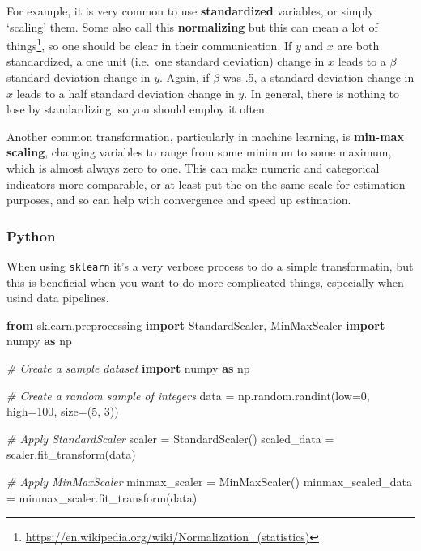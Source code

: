 \documentclass[
  letterpaper,
]{krantz}
\newenvironment{Shaded}{}{}
\newcommand{\CommentTok}[1]{\textcolor[rgb]{0.38,0.63,0.69}{\textit{#1}}}
\newcommand{\DecValTok}[1]{\textcolor[rgb]{0.25,0.63,0.44}{#1}}
\newcommand{\ImportTok}[1]{\textcolor[rgb]{0.00,0.50,0.00}{\textbf{#1}}}
\newcommand{\NormalTok}[1]{#1}
\newcommand{\OperatorTok}[1]{\textcolor[rgb]{0.40,0.40,0.40}{#1}}
\DeclareRobustCommand{\href}[2]{#2\footnote{\url{#1}}}
\begin{document}
For example, it is very common to use \textbf{standardized} variables,
or simply `scaling' them. Some also call this \textbf{normalizing} but
\href{https://en.wikipedia.org/wiki/Normalization_(statistics)}{this can
mean a lot of things}, so one should be clear in their communication. If
\(y\) and \(x\) are both standardized, a one unit (i.e.~one standard
deviation) change in \(x\) leads to a \(\beta\) standard deviation
change in \(y\). Again, if \(\beta\) was .5, a standard deviation change
in \(x\) leads to a half standard deviation change in \(y\). In general,
there is nothing to lose by standardizing, so you should employ it
often.

Another common transformation, particularly in machine learning, is
\textbf{min-max scaling}, changing variables to range from some minimum
to some maximum, which is almost always zero to one. This can make
numeric and categorical indicators more comparable, or at least put the
on the same scale for estimation purposes, and so can help with
convergence and speed up estimation.

\subsubsection{Python}

When using \texttt{sklearn} it's a very verbose process to do a simple
transformatin, but this is beneficial when you want to do more
complicated things, especially when usind data pipelines.

\begin{Shaded}
\begin{Highlighting}[]
\ImportTok{from}\NormalTok{ sklearn.preprocessing }\ImportTok{import}\NormalTok{ StandardScaler, MinMaxScaler}
\ImportTok{import}\NormalTok{ numpy }\ImportTok{as}\NormalTok{ np}

\CommentTok{\# Create a sample dataset}
\ImportTok{import}\NormalTok{ numpy }\ImportTok{as}\NormalTok{ np}

\CommentTok{\# Create a random sample of integers}
\NormalTok{data }\OperatorTok{=}\NormalTok{ np.random.randint(low}\OperatorTok{=}\DecValTok{0}\NormalTok{, high}\OperatorTok{=}\DecValTok{100}\NormalTok{, size}\OperatorTok{=}\NormalTok{(}\DecValTok{5}\NormalTok{, }\DecValTok{3}\NormalTok{))}

\CommentTok{\# Apply StandardScaler}
\NormalTok{scaler }\OperatorTok{=}\NormalTok{ StandardScaler()}
\NormalTok{scaled\_data }\OperatorTok{=}\NormalTok{ scaler.fit\_transform(data)}

\CommentTok{\# Apply MinMaxScaler}
\NormalTok{minmax\_scaler }\OperatorTok{=}\NormalTok{ MinMaxScaler()}
\NormalTok{minmax\_scaled\_data }\OperatorTok{=}\NormalTok{ minmax\_scaler.fit\_transform(data)}
\end{Highlighting}
\end{Shaded}
\end{document}
